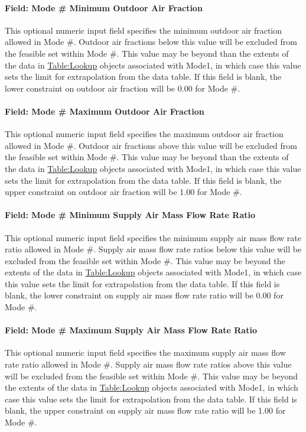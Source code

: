 \paragraph{Field: Mode \# Minimum Outdoor Air Fraction}
This optional numeric input field specifies the minimum outdoor air fraction allowed in Mode \#. Outdoor air fractions below this value will be excluded from the feasible set within Mode \#. This value may be beyond than the extents of the data in \hyperref[tablelookup]{Table:Lookup} objects associated with Mode1, in which case this value sets the limit for extrapolation from the data table. If this field is blank, the lower constraint on outdoor air fraction will be 0.00 for Mode \#.

\paragraph{Field: Mode \# Maximum Outdoor Air Fraction}
This optional numeric input field specifies the maximum outdoor air fraction allowed in Mode \#. Outdoor air fractions above this value will be excluded from the feasible set within Mode \#. This value may be beyond than the extents of the data in \hyperref[tablelookup]{Table:Lookup} objects associated with Mode1, in which case this value sets the limit for extrapolation from the data table. If this field is blank, the upper constraint on outdoor air fraction will be 1.00 for Mode \#.

\paragraph{Field: Mode \# Minimum Supply Air Mass Flow Rate Ratio}
This optional numeric input field specifies the minimum supply air mass flow rate ratio allowed in Mode \#. Supply air mass flow rate ratios below this value will be excluded from the feasible set within Mode \#. This value may be beyond the extents of the data in \hyperref[tablelookup]{Table:Lookup} objects associated with Mode1, in which case this value sets the limit for extrapolation from the data table. If this field is blank, the lower constraint on supply air mass flow rate ratio will be 0.00 for Mode \#.

\paragraph{Field: Mode \# Maximum Supply Air Mass Flow Rate Ratio}
This optional numeric input field specifies the maximum supply air mass flow rate ratio allowed in Mode \#. Supply air mass flow rate ratios above this value will be excluded from the feasible set within Mode \#. This value may be beyond the extents of the data in \hyperref[tablelookup]{Table:Lookup} objects associated with Mode1, in which case this value sets the limit for extrapolation from the data table. If this field is blank, the upper constraint on supply air mass flow rate ratio will be 1.00 for Mode \#.

